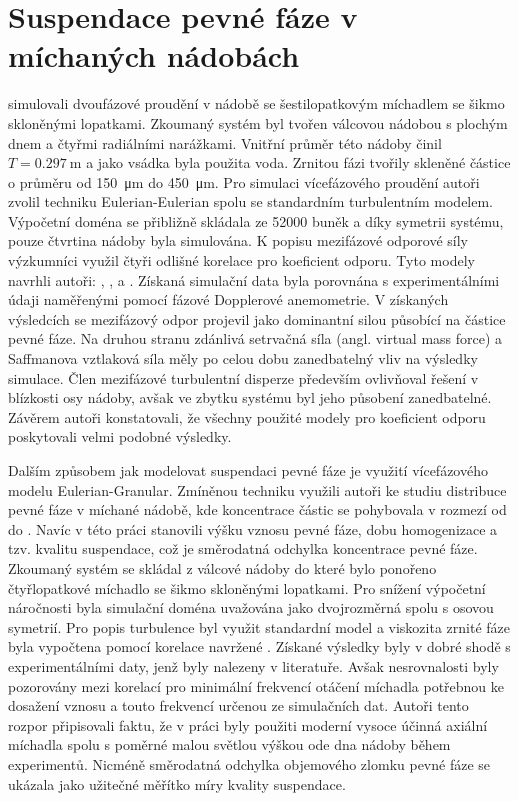 \section{Suspendace pevné fáze v míchaných nádobách}
\citet{lju01} simulovali dvoufázové proudění v nádobě se šestilopatkovým míchadlem se šikmo skloněnými lopatkami. Zkoumaný systém byl tvořen válcovou nádobou s plochým dnem a čtyřmi radiálními narážkami. Vnitřní průměr této nádoby činil $T=\SI{0.297}{\meter}$ a jako vsádka byla použita voda. Zrnitou fázi tvořily skleněné částice o průměru od \SI{150}{\micro\meter} do \SI{450}{\micro\meter}. Pro simulaci vícefázového proudění autoři zvolil techniku Eulerian-Eulerian spolu se standardním \keps{} turbulentním modelem. Výpočetní doména se přibližně skládala ze \num{52000} buněk a díky symetrii systému, pouze čtvrtina nádoby byla simulována. K popisu mezifázové odporové síly výzkumníci využil čtyři odlišné korelace pro koeficient odporu. Tyto modely navrhli autoři: \citet{schi32}, \citet{ish79}, \citet{ihme72} a \citet{bru98}. Získaná simulační data byla porovnána s experimentálními údaji naměřenými pomocí fázové Dopplerové anemometrie. V získaných výsledcích se mezifázový odpor projevil jako dominantní silou působící na částice pevné fáze. Na druhou stranu zdánlivá setrvačná síla (angl. virtual mass force) a Saffmanova vztlaková síla měly po celou dobu zanedbatelný vliv na výsledky simulace. Člen mezifázové turbulentní disperze především ovlivňoval řešení v blízkosti osy nádoby, avšak ve zbytku systému byl jeho působení zanedbatelné. Závěrem autoři konstatovali, že všechny použité modely pro koeficient odporu poskytovali velmi podobné výsledky.

Dalším způsobem jak modelovat suspendaci pevné fáze je využití vícefázového modelu Eulerian-Granular. Zmíněnou techniku využili autoři \citet{oshi02} ke studiu distribuce pevné fáze v míchané nádobě, kde koncentrace částic se pohybovala v rozmezí od  do . Navíc v této práci stanovili výšku vznosu pevné fáze, dobu homogenizace a tzv. kvalitu suspendace, což je směrodatná odchylka koncentrace pevné fáze. Zkoumaný systém se skládal z válcové nádoby do které bylo ponořeno čtyřlopatkové míchadlo se šikmo skloněnými lopatkami. Pro snížení výpočetní náročnosti byla simulační doména uvažována jako dvojrozměrná spolu s osovou symetrií. Pro popis turbulence byl využit standardní \keps{} model a viskozita zrnité fáze byla vypočtena pomocí korelace navržené \citet{syam93}. Získané výsledky byly v dobré shodě s experimentálními daty, jenž byly nalezeny v literatuře. Avšak nesrovnalosti byly pozorovány mezi korelací pro minimální frekvencí otáčení míchadla potřebnou ke dosažení vznosu a touto frekvencí určenou ze simulačních dat. Autoři tento rozpor připisovali faktu, že v práci byly použiti moderní vysoce účinná axiální míchadla spolu s poměrné malou světlou výškou ode dna nádoby během experimentů. Nicméně směrodatná odchylka objemového zlomku pevné fáze se ukázala jako užitečné měřítko míry kvality suspendace.        

